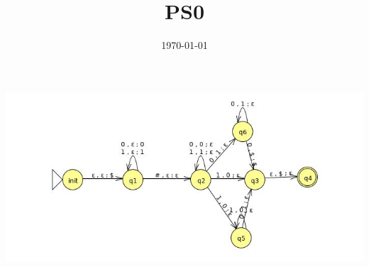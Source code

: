 \documentclass{article}
\title{PS0}
\date{\today}
\begin{document}
\maketitle
\begin{center}
\includegraphics[width=1.5\textwidth]{ps04-06-1}
\end{center}
\end{document}
